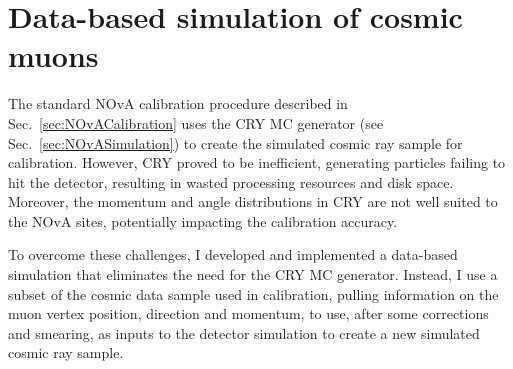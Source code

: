 

\section{Data-based simulation of cosmic muons}\label{sec:DataBasedSimulation}
The standard \gls{NOvA} calibration procedure described in Sec.~\ref{sec:NOvACalibration} uses the \gls{CRY} \gls{MC} generator (see Sec.~\ref{sec:NOvASimulation}) to create the simulated cosmic ray sample for calibration. However, \gls{CRY} proved to be inefficient, generating particles failing to hit the detector, resulting in wasted processing resources and disk space. Moreover, the momentum and angle distributions in \gls{CRY} are not well suited to the \gls{NOvA} sites, potentially impacting the calibration accuracy.

To overcome these challenges, I developed and implemented a data-based simulation that eliminates the need for the \gls{CRY} \gls{MC} generator. Instead, I use a subset of the cosmic data sample used in calibration, pulling information on the muon vertex position, direction and momentum, to use, after some corrections and smearing, as inputs to the detector simulation to create a new simulated cosmic ray sample.


